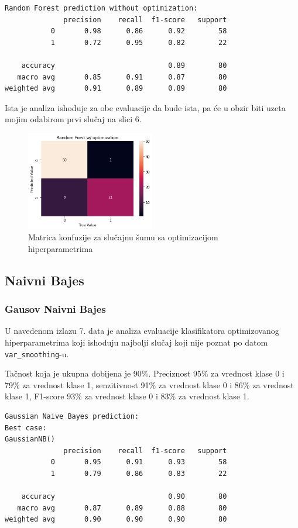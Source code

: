 \documentclass[fontsize=12bp, paper=a4]{scrarticle}
\begin{document}
\begin{lstlisting}[caption=Slučajne šume bez optimizacija hiperparametara]
Random Forest prediction without optimization:
              precision    recall  f1-score   support
           0       0.98      0.86      0.92        58
           1       0.72      0.95      0.82        22

    accuracy                           0.89        80
   macro avg       0.85      0.91      0.87        80
weighted avg       0.91      0.89      0.89        80
\end{lstlisting}

Ista je analiza ishoduje za obe evaluacije da bude ista, pa će u obzir biti uzeta mojim odabirom prvi slučaj na slici 6.

\begin{figure}[h!]
    \centering
    \includegraphics[width=0.5\textwidth]{35}
    \caption{Matrica konfuzije za slučajnu šumu sa optimizacijom hiperparametrima}
\end{figure}

\subsection{Naivni Bajes}
\subsubsection{Gausov Naivni Bajes}
U navedenom izlazu 7. data je analiza evaluacije klasifikatora 
 optimizovanog hiperparametrima koji ishoduju najbolji slučaj koji nije poznat po datom \verb|var_smoothing|-u.
 
 Tačnost koja je ukupna dobijena je 90\%. Preciznost 95\% za vrednost klase 0 i 79\% za vrednost klase 1, senzitivnost 91\% za vrednost klase 0 i 86\% za vrednost klase 1, F1-score 93\% za vrednost klase 0 i 83\% za vrednost klase 1.

\begin{lstlisting}[caption=Gausov naivni Bajes sa optimizacijom hiperparametara]
Gaussian Naive Bayes prediction:
Best case:
GaussianNB()
              precision    recall  f1-score   support
           0       0.95      0.91      0.93        58
           1       0.79      0.86      0.83        22

    accuracy                           0.90        80
   macro avg       0.87      0.89      0.88        80
weighted avg       0.90      0.90      0.90        80
\end{lstlisting}
\end{document}

